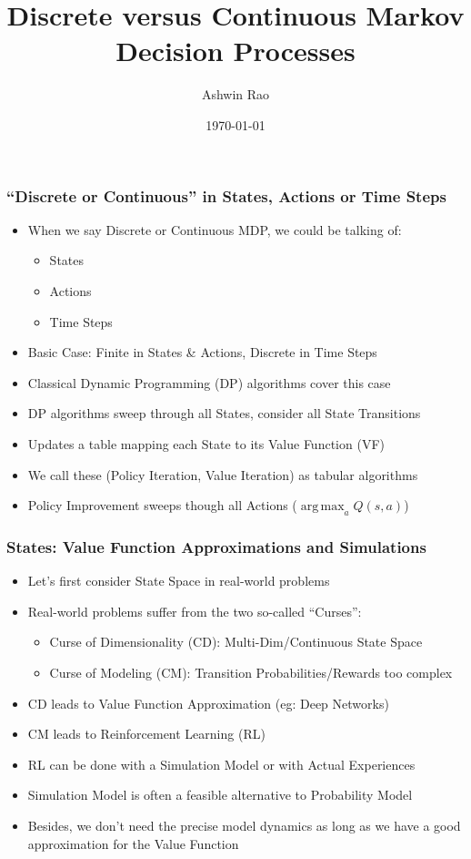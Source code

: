 \documentclass[handout]{beamer}
\title[Discrete versus Continuous MDPs]{Discrete versus Continuous Markov Decision Processes} %
\author{Ashwin Rao} %
\institute[Stanford] %
{
ICME, Stanford University
}
\date{\today} %
\DeclareMathOperator*{\argmax}{arg\,max}
\begin{document}
\begin{frame}
\titlepage %
\end{frame}


\begin{frame}
\frametitle{``Discrete or Continuous'' in States, Actions or Time Steps}
\pause
\begin{itemize}[<+->]
\item When we say Discrete or Continuous MDP, we could be talking of:
\begin{itemize}
\item States
\item Actions
\item Time Steps
\end{itemize}
\item Basic Case: Finite in States \& Actions, Discrete in Time Steps
\item Classical Dynamic Programming (DP) algorithms cover this case
\item DP algorithms sweep through all States, consider all State Transitions
\item Updates a table mapping each State to its Value Function (VF)
\item We call these (Policy Iteration, Value Iteration) as tabular algorithms
\item Policy Improvement sweeps though all Actions ($\argmax_a Q(s,a)$)
\end{itemize}
\end{frame}

\begin{frame}
\frametitle{States: Value Function Approximations and Simulations}
\pause
\begin{itemize}[<+->]
\item Let's first consider State Space in real-world problems
\item Real-world problems suffer from the two so-called ``Curses'':
\begin{itemize}
\item Curse of Dimensionality (CD): Multi-Dim/Continuous State Space
\item Curse of Modeling (CM): Transition Probabilities/Rewards too complex
\end{itemize}
\item CD leads to Value Function Approximation (eg: Deep Networks)
\item CM leads to Reinforcement Learning (RL)
\item RL can be done with a Simulation Model or with Actual Experiences
\item Simulation Model is often a feasible alternative to Probability Model
\item Besides, we don't need the precise model dynamics as long as we have a good approximation for the Value Function
\end{itemize}
\end{frame}
\end{document}
